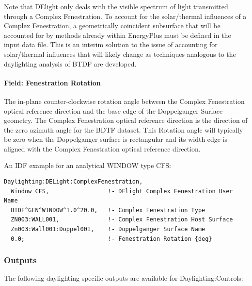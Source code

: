Note that DElight only deals with the visible spectrum of light transmitted through a Complex Fenestration. To account for the solar/thermal influences of a Complex Fenestration, a geometrically coincident subsurface that will be accounted for by methods already within EnergyPlus must be defined in the input data file. This is an interim solution to the issue of accounting for solar/thermal influences that will likely change as techniques analogous to the daylighting analysis of BTDF are developed.

\paragraph{Field: Fenestration Rotation}\label{field-fenestration-rotation}

The in-plane counter-clockwise rotation angle between the Complex Fenestration optical reference direction and the base edge of the Doppelganger Surface geometry. The Complex Fenestration optical reference direction is the direction of the zero azimuth angle for the BDTF dataset. This Rotation angle will typically be zero when the Doppelganger surface is rectangular and its width edge is aligned with the Complex Fenestration optical reference direction.

An IDF example for an analytical WINDOW type CFS:

\begin{lstlisting}
Daylighting:DELight:ComplexFenestration,
  Window CFS,                 !- DElight Complex Fenestration User Name
  BTDF^GEN^WINDOW^1.0^20.0,   !- Complex Fenestration Type
  ZN003:WALL001,              !- Complex Fenestration Host Surface
  Zn003:Wall001:Doppel001,    !- Doppelganger Surface Name
  0.0;                        !- Fenestration Rotation {deg}
\end{lstlisting}

\subsubsection{Outputs}\label{outputs-1-004}

The following daylighting-specific outputs are available for Daylighting:Controls:


